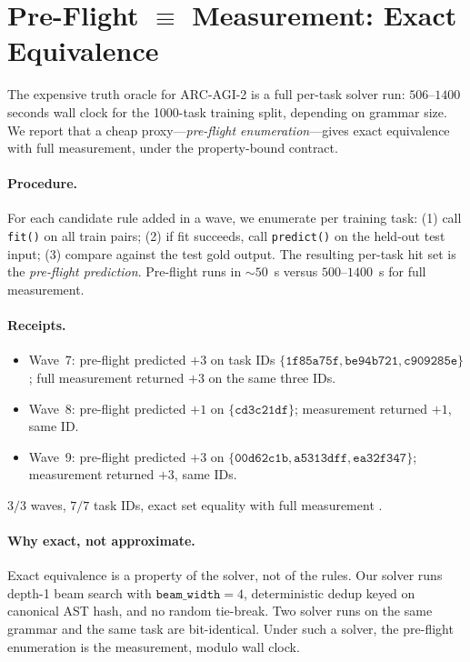 \documentclass[11pt]{article}
\begin{document}
\section{Pre-Flight $\equiv$ Measurement: Exact Equivalence}
\label{sec:preflight}

The expensive truth oracle for ARC-AGI-2 is a full per-task solver run:
$506$--$1400$ seconds wall clock for the 1000-task training split,
depending on grammar size. We report that a cheap proxy---\emph{pre-flight
enumeration}---gives exact equivalence with full measurement, under the
property-bound contract.

\paragraph{Procedure.}
For each candidate rule added in a wave, we enumerate per training task:
(1) call \texttt{fit()} on all train pairs; (2) if fit succeeds, call
\texttt{predict()} on the held-out test input; (3) compare against the
test gold output. The resulting per-task hit set is the
\emph{pre-flight prediction}. Pre-flight runs in $\sim 50$~s versus
$500$--$1400$~s for full measurement.

\paragraph{Receipts.}
\begin{itemize}
  \item Wave~7: pre-flight predicted $+3$ on task IDs
        $\{\texttt{1f85a75f}, \texttt{be94b721}, \texttt{c909285e}\}$;
        full measurement returned $+3$ on the same three IDs.
  \item Wave~8: pre-flight predicted $+1$ on $\{\texttt{cd3c21df}\}$;
        measurement returned $+1$, same ID.
  \item Wave~9: pre-flight predicted $+3$ on
        $\{\texttt{00d62c1b}, \texttt{a5313dff}, \texttt{ea32f347}\}$;
        measurement returned $+3$, same IDs.
\end{itemize}
$3/3$ waves, $7/7$ task IDs, exact set equality with full measurement
\cite{innovations}.

\paragraph{Why exact, not approximate.}
Exact equivalence is a property of the solver, not of the rules. Our
solver runs depth-1 beam search with $\mathtt{beam\_width}=4$,
deterministic dedup keyed on canonical AST hash, and no random tie-break.
Two solver runs on the same grammar and the same task are bit-identical.
Under such a solver, the pre-flight enumeration is the measurement,
modulo wall clock.
\end{document}
